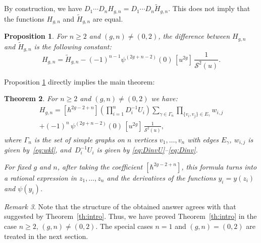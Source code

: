 \documentclass[JEP,XML,SOM,Unicode,NoEqCountersInSection,NoFloatCountersInSection]{cedram}
\let\mathcal\mathscr
\theoremstyle{plain}
\newtheorem{theorem}{Theorem}[section]
\newtheorem{proposition}[theorem]{Proposition}
\theoremstyle{definition}
\theoremstyle{remark}
\newtheorem{remark}[theorem]{Remark}
\newcommand{\cS}{\mathcal{S}}
\newcommand{\Hc}{H}
\begin{document}
By construction, we have $D_1\cdots D_n H_{g,n}=D_1\cdots D_n \widetilde H_{g,n}$. This does not imply that the functions $H_{g,n}$ and $\widetilde H_{g,n}$ are equal.

\begin{proposition}\label{prop:tHconst}
For $n\geq 2$ and $(g,n)\ne(0,2)$, the difference between $H_{g,n}$ and $\widetilde{H}_{g,n}$ is the following constant:
\begin{equation}\label{eq:tHconst}
H_{g,n} = \widetilde{H}_{g,n} - (-1)^{n-1}
\psi^{(2g+n-2)}(0)\,[u^{2g}]\,\frac1{\cS^2(u)}.
\end{equation}
\end{proposition}

Proposition \ref{prop:tHconst} directly implies the main theorem:
\begin{theorem}\label{th:MainTh}
For $n\geq 2$ and $(g,n)\ne(0,2)$ we have:
\begin{multline}\label{eq:mainth}
\Hc_{g,n}= [\hbar^{2g-2+n}] \left(\textstyle\prod_{i=1}^n D_i^{-1}U_i\right) \sum\limits_{\gamma\in\Gamma_n}\prod\limits_{\{v_i,v_j\}\in E_\gamma} w_{i,j}\\
+ (-1)^{n}\,\psi^{(2g+n-2)}(0)\,[u^{2g}]\,\frac1{\cS^2(u)},
\end{multline}
where $\Gamma_n$ is the set of simple graphs on $n$ vertices $v_1,\ldots,v_n$ with edges $E_\gamma$, $w_{i,j}$ is given by~\eqref{eq:wkl}, and~$D_i^{-1}U_i$ is given by \eqref{eq:DinvU}--\eqref{eq:Dinv}.

For fixed $g$ and $n$, after taking the coefficient $[\hbar^{2g-2+n}]$,
this formula turns into a rational expression in $z_1,\ldots,z_n$ and the derivatives of the functions $y_i=y(z_i)$ and $\psi(y_i)$.
\end{theorem}
\begin{remark}
Note that the structure of the obtained answer agrees with that suggested by Theorem~\ref{th:intro}. Thus, we have proved Theorem~\ref{th:intro} in the case $n\ge2$, $(g,n)\ne(0,2)$.
The special cases $n=1$ and $(g,n)=(0,2)$ are treated in the next section.
\end{remark}
\end{document}
